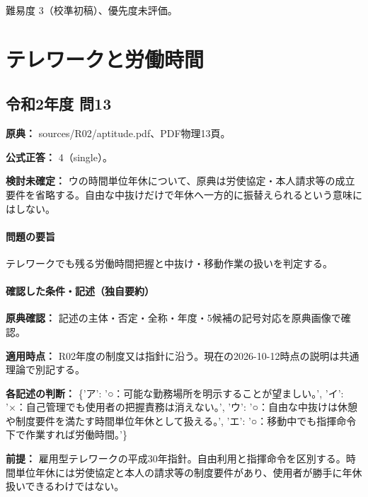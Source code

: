 \par 難易度 3（校準初稿）、優先度未評価。

\section{テレワークと労働時間}

\subsection{令和2年度 問13}
\label{q:r02-reg-apt-13}

\noindent\textbf{原典：} sources/R02/aptitude.pdf、PDF物理13頁。

\textbf{公式正答：} 4（single）。

\par\textbf{検討未確定：} ウの時間単位年休について、原典は労使協定・本人請求等の成立要件を省略する。自由な中抜けだけで年休へ一方的に振替えられるという意味にはしない。

\paragraph{問題の要旨} テレワークでも残る労働時間把握と中抜け・移動作業の扱いを判定する。

\paragraph{確認した条件・記述（独自要約）}\mbox{}\par

\noindent\textbf{原典確認：} 記述の主体・否定・全称・年度・5候補の記号対応を原典画像で確認。\par

\noindent\textbf{適用時点：} R02年度の制度又は指針に沿う。現在の2026-10-12時点の説明は共通理論で別記する。\par

\noindent\textbf{各記述の判断：} \{'ア': '○：可能な勤務場所を明示することが望ましい。', 'イ': '×：自己管理でも使用者の把握責務は消えない。', 'ウ': '○：自由な中抜けは休憩や制度要件を満たす時間単位年休として扱える。', 'エ': '○：移動中でも指揮命令下で作業すれば労働時間。'\}\par

\noindent\textbf{前提：} 雇用型テレワークの平成30年指針。自由利用と指揮命令を区別する。時間単位年休には労使協定と本人の請求等の制度要件があり、使用者が勝手に年休扱いできるわけではない。\par

